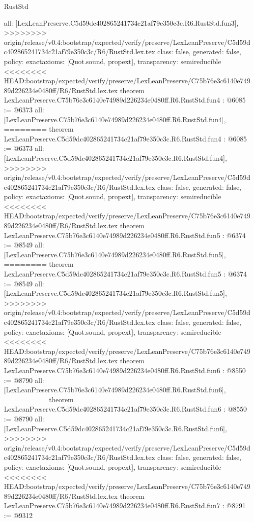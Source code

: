 \begin{lexlean}{RustStd}
\begin{coremodule}
{\begin{coremodule}
{{{{{{{  all: [LexLeanPreserve.C5d59dc402865241734c21af79e350c3c.R6.RustStd.fun3],
>>>>>>>> origin/release/v0.4:bootstrap/expected/verify/preserve/LexLeanPreserve/C5d59dc402865241734c21af79e350c3c/R6/RustStd.lex.tex
  class: false,
  generated: false,
  policy: exact{axioms: [Quot.sound, propext]},
  transparency: semireducible
}
<<<<<<<< HEAD:bootstrap/expected/verify/preserve/LexLeanPreserve/C75b76e3c6140e74989d226234e0480ff/R6/RustStd.lex.tex
theorem LexLeanPreserve.C75b76e3c6140e74989d226234e0480ff.R6.RustStd.fun4 : @6085 := @6373 {
  all: [LexLeanPreserve.C75b76e3c6140e74989d226234e0480ff.R6.RustStd.fun4],
========
theorem LexLeanPreserve.C5d59dc402865241734c21af79e350c3c.R6.RustStd.fun4 : @6085 := @6373 {
  all: [LexLeanPreserve.C5d59dc402865241734c21af79e350c3c.R6.RustStd.fun4],
>>>>>>>> origin/release/v0.4:bootstrap/expected/verify/preserve/LexLeanPreserve/C5d59dc402865241734c21af79e350c3c/R6/RustStd.lex.tex
  class: false,
  generated: false,
  policy: exact{axioms: [Quot.sound, propext]},
  transparency: semireducible
}
<<<<<<<< HEAD:bootstrap/expected/verify/preserve/LexLeanPreserve/C75b76e3c6140e74989d226234e0480ff/R6/RustStd.lex.tex
theorem LexLeanPreserve.C75b76e3c6140e74989d226234e0480ff.R6.RustStd.fun5 : @6374 := @8549 {
  all: [LexLeanPreserve.C75b76e3c6140e74989d226234e0480ff.R6.RustStd.fun5],
========
theorem LexLeanPreserve.C5d59dc402865241734c21af79e350c3c.R6.RustStd.fun5 : @6374 := @8549 {
  all: [LexLeanPreserve.C5d59dc402865241734c21af79e350c3c.R6.RustStd.fun5],
>>>>>>>> origin/release/v0.4:bootstrap/expected/verify/preserve/LexLeanPreserve/C5d59dc402865241734c21af79e350c3c/R6/RustStd.lex.tex
  class: false,
  generated: false,
  policy: exact{axioms: [Quot.sound, propext]},
  transparency: semireducible
}
<<<<<<<< HEAD:bootstrap/expected/verify/preserve/LexLeanPreserve/C75b76e3c6140e74989d226234e0480ff/R6/RustStd.lex.tex
theorem LexLeanPreserve.C75b76e3c6140e74989d226234e0480ff.R6.RustStd.fun6 : @8550 := @8790 {
  all: [LexLeanPreserve.C75b76e3c6140e74989d226234e0480ff.R6.RustStd.fun6],
========
theorem LexLeanPreserve.C5d59dc402865241734c21af79e350c3c.R6.RustStd.fun6 : @8550 := @8790 {
  all: [LexLeanPreserve.C5d59dc402865241734c21af79e350c3c.R6.RustStd.fun6],
>>>>>>>> origin/release/v0.4:bootstrap/expected/verify/preserve/LexLeanPreserve/C5d59dc402865241734c21af79e350c3c/R6/RustStd.lex.tex
  class: false,
  generated: false,
  policy: exact{axioms: [Quot.sound, propext]},
  transparency: semireducible
}
<<<<<<<< HEAD:bootstrap/expected/verify/preserve/LexLeanPreserve/C75b76e3c6140e74989d226234e0480ff/R6/RustStd.lex.tex
theorem LexLeanPreserve.C75b76e3c6140e74989d226234e0480ff.R6.RustStd.fun7 : @8791 := @9312 {
}}}}}}}}}}
\end{coremodule}}
\end{coremodule}
\end{lexlean}

